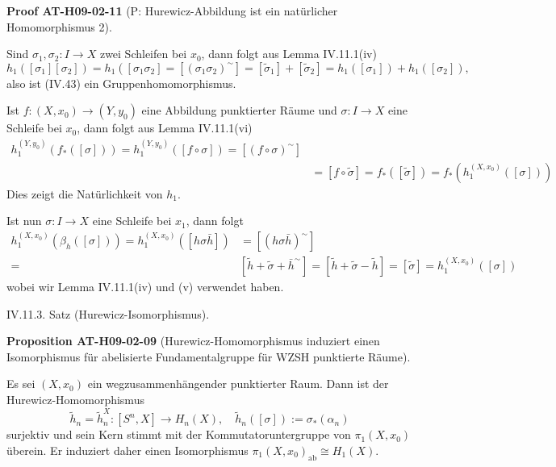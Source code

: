 \documentclass[10pt, letterpaper]{article}
\newcommand{\CustomHeading}[3]{%
  \par\medskip\noindent%
  \textbf{#1 #2} \textnormal{(#3)}.\enskip%
}
\newenvironment{PROP}[2]{\begin{unitbox}\CustomHeading{Proposition}{#1}{#2}}{\end{unitbox}}
\newenvironment{PROOF}[2]{\begin{unitbox}\CustomHeading{Proof}{#1}{#2}}{\end{unitbox}}
\begin{document}
\begin{PROOF}{AT-H09-02-11}{P: Hurewicz-Abbildung ist ein natürlicher Homomorphismus 2}
Sind $\sigma_1, \sigma_2: I \rightarrow X$ zwei Schleifen bei $x_0$, dann folgt aus Lemma IV.11.1(iv)
$$
h_1\left(\left[\sigma_1\right]\left[\sigma_2\right]\right)=h_1\left(\left[\sigma_1 \sigma_2\right]=\left[\left(\sigma_1 \sigma_2\right)^{\sim}\right]=\left[\tilde{\sigma}_1\right]+\left[\tilde{\sigma}_2\right]=h_1\left(\left[\sigma_1\right]\right)+h_1\left(\left[\sigma_2\right]\right),\right.
$$
also ist (IV.43) ein Gruppenhomomorphismus. 

Ist $f:\left(X, x_0\right) \rightarrow\left(Y, y_0\right)$ eine Abbildung punktierter Räume und $\sigma: I \rightarrow X$ eine Schleife bei $x_0$, dann folgt aus Lemma IV.11.1(vi)
$$
\begin{aligned}
h_1^{\left(Y, y_0\right)}\left(f_*([\sigma])\right)=h_1^{\left(Y, y_0\right)}([f \circ \sigma])=\left[(f \circ \sigma)^{\sim}\right] & \\
& =[f \circ \tilde{\sigma}]=f_*([\tilde{\sigma}])=f_*\left(h_1^{\left(X, x_0\right)}([\sigma])\right)
\end{aligned}
$$
Dies zeigt die Natürlichkeit von $h_1$. 

Ist nun $\sigma: I \rightarrow X$ eine Schleife bei $x_1$, dann folgt
$$
\begin{aligned}
h_1^{\left(X, x_0\right)}\left(\beta_h([\sigma])\right)=h_1^{\left(X, x_0\right)}([h \sigma \bar{h}]) & =\left[(h \sigma \bar{h})^{\sim}\right] \\
= & {\left[\tilde{h}+\tilde{\sigma}+\bar{h}^{\sim}\right]=[\tilde{h}+\tilde{\sigma}-\tilde{h}]=[\tilde{\sigma}]=h_1^{\left(X, x_0\right)}([\sigma]) }
\end{aligned}
$$
wobei wir Lemma IV.11.1(iv) und (v) verwendet haben.
\end{PROOF}


IV.11.3. Satz (Hurewicz-Isomorphismus). 


\begin{PROP}{AT-H09-02-09}{Hurewicz-Homomorphismus induziert einen Isomorphismus für abelisierte Fundamentalgruppe für WZSH punktierte Räume}
Es sei $(X, x_0)$ ein wegzusammenhängender punktierter Raum. Dann ist der Hurewicz-Homomorphismus 
$$\tilde{h}_n=\tilde{h}_n^X:\left[S^n, X\right] \rightarrow H_n(X), \quad \tilde{h}_n([\sigma]):=\sigma_*\left(\alpha_n\right)$$
surjektiv und sein Kern stimmt mit der Kommutatoruntergruppe von $\pi_1\left(X, x_0\right)$ überein. Er induziert daher einen Isomorphismus $\pi_1\left(X, x_0\right)_{\mathrm{ab}} \cong H_1(X)$.
\end{PROP}
\end{document}
